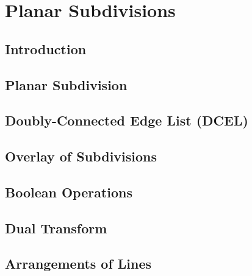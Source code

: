 \section{Planar Subdivisions}
\subsection{Introduction}
\subsection{Planar Subdivision}
\subsection{Doubly-Connected Edge List (DCEL)}
\subsection{Overlay of Subdivisions}
\subsection{Boolean Operations}
\subsection{Dual Transform}
\subsection{Arrangements of Lines}
